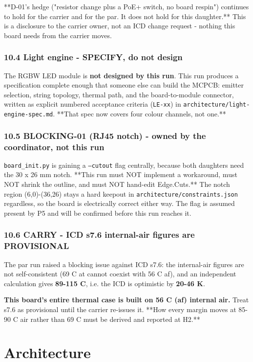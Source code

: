 \documentclass[11pt,a4paper]{article}
\begin{document}
{*}{*}D-01's hedge ("resistor change plus a PoE+ switch, no board respin") continues to hold for the carrier and for the par. It does not hold for this daughter.{*}{*} This is a disclosure to the carrier owner, not an ICD change request - nothing this board needs from the carrier moves.

\subsubsection*{10.4 Light engine - SPECIFY, do not design}
The RGBW LED module is \textbf{not designed by this run}. This run produces a specification complete enough that someone else can build the MCPCB: emitter selection, string topology, thermal path, and the board-to-module connector, written as explicit numbered acceptance criteria (\texttt{LE-xx}) in \texttt{architecture/light-engine-spec.md}. {*}{*}That spec now covers four colour channels, not one.{*}{*}

\subsubsection*{10.5 BLOCKING-01 (RJ45 notch) - owned by the coordinator, not this run}
\texttt{board\_init.py} is gaining a \texttt{--cutout} flag centrally, because both daughters need the 30 x 26 mm notch. {*}{*}This run must NOT implement a workaround, must NOT shrink the outline, and must NOT hand-edit Edge.Cuts.{*}{*} The notch region (6,0)-(36,26) stays a hard keepout in \texttt{architecture/constraints.json} regardless, so the board is electrically correct either way. The flag is assumed present by P5 and will be confirmed before this run reaches it.

\subsubsection*{10.6 CARRY - ICD s7.6 internal-air figures are PROVISIONAL}
The par run raised a blocking issue against ICD s7.6: the internal-air figures are not self-consistent (69 C at cannot coexist with 56 C af), and an independent calculation gives \textbf{89-115 C}, i.e. the ICD is optimistic by \textbf{20-46 K}.

\textbf{This board's entire thermal case is built on 56 C (af) internal air.} Treat s7.6 as provisional until the carrier re-issues it. {*}{*}How every margin moves at 85-90 C air rather than 69 C must be derived and reported at H2.{*}{*}

\section{Architecture}
\end{document}
